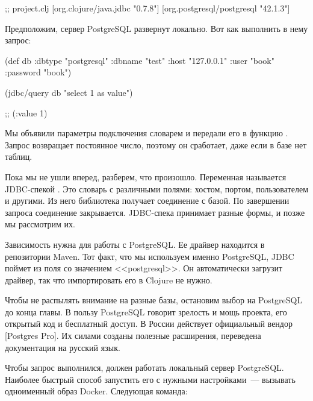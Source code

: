 \begin{english}
  \begin{clojure}
;; project.clj
[org.clojure/java.jdbc "0.7.8"]
[org.postgresql/postgresql "42.1.3"]
  \end{clojure}
\end{english}

Предположим, сервер PostgreSQL развернут локально. Вот как выполнить в нему запрос:

\begin{english}
  \begin{clojure/lines}
(def db {:dbtype "postgresql"
         :dbname "test"
         :host "127.0.0.1"
         :user "book"
         :password "book"})

(jdbc/query db "select 1 as value")

;; ({:value 1})
  \end{clojure/lines}
\end{english}

Мы объявили параметры подключения словарем и передали его в функцию . Запрос возвращает постоянное число, поэтому он сработает, даже если в базе нет таблиц.

Пока мы не ушли вперед, разберем, что произошло. Переменная  называется JDBC-спекой . Это словарь с различными полями: хостом, портом, пользователем и другими. Из него библиотека получает соединение с базой. По завершении запроса соединение закрывается. JDBC-спека принимает разные формы, и позже мы рассмотрим их.

\def\urlpgpro{https://postgrespro.ru}

Зависимость  нужна для работы с PostgreSQL. Ее драйвер находится в репозитории Maven. Тот факт, что мы используем именно PostgreSQL, JDBC поймет из поля  со значением <<postgresql>>. Он автоматически загрузит драйвер, так что импортировать его в Clojure не нужно.

Чтобы не распылять внимание на разные базы, остановим выбор на PostgreSQL до конца главы. В пользу PostgreSQL говорит зрелость и мощь проекта, его открытый код и бесплатный доступ. В России действует официальный вендор \footurl{PostgresPro}{\urlpgpro}[Postgres Pro]. Их силами созданы полезные расширения, переведена документация на русский язык.

Чтобы запрос выполнился, должен работать локальный сервер PostgreSQL. Наиболее быстрый способ запустить его с нужными настройками~--- вызывать одноименный образ Docker. Следующая команда:

